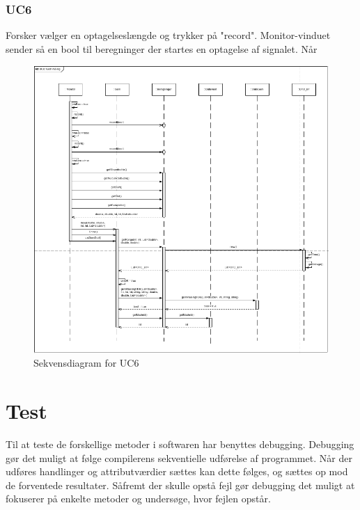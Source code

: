 \subsubsection{UC6}
Forsker vælger en optagelseslængde og trykker på "record". Monitor-vinduet sender så en bool til beregninger der startes en optagelse af signalet. Når 

\begin{figure}[H]
	\centering
	\includegraphics[width=1\textwidth]{Figurer/UC6_SD_SW}
	\caption{Sekvensdiagram for UC6}
\end{figure}

\section{Test}
Til at teste de forskellige metoder i softwaren har benyttes debugging. Debugging gør det muligt at følge compilerens sekventielle udførelse af programmet. Når der udføres handlinger og attributværdier sættes kan dette følges, og sættes op mod de forventede resultater. Såfremt der skulle opstå fejl gør debugging det muligt at fokuserer på enkelte metoder og undersøge, hvor fejlen opstår.
